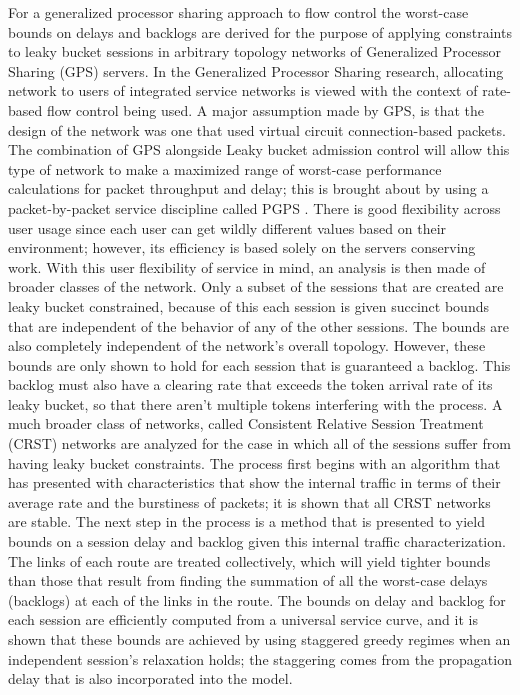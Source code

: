 \documentclass{sigcomm-alternate}
\begin{document}
For a generalized processor sharing approach to flow control the worst-case bounds on delays and backlogs are derived for the purpose of applying constraints to leaky bucket sessions in arbitrary topology networks of Generalized Processor Sharing (GPS) \cite{Parek} servers. In the Generalized Processor Sharing research, allocating network to users of integrated service networks is viewed with the context of rate-based flow control being used. A major assumption made by GPS, is that the design of the network was one that used virtual circuit connection-based packets. The combination of GPS alongside Leaky bucket admission control will allow this type of network to make a maximized range of worst-case performance calculations for packet throughput and delay; this is brought about by using a packet-by-packet service discipline called PGPS \cite{demers}. There is good flexibility across user usage since each user can get wildly different values based on their environment; however, its efficiency is based solely on the servers conserving work. 
With this user flexibility of service in mind, an analysis is then made of broader classes of the network. Only a subset of the sessions that are created are leaky bucket constrained, because of this each session is given succinct bounds that are independent of the behavior of any of the other sessions. The bounds are also completely independent of the network’s overall topology. However, these bounds are only shown to hold for each session that is guaranteed a backlog. This backlog must also have a clearing rate that exceeds the token arrival rate of its leaky bucket, so that there aren’t multiple tokens interfering with the process.
A much broader class of networks, called Consistent Relative Session Treatment (CRST) networks are analyzed for the case in which all of the sessions suffer from having leaky bucket constraints. The process first begins with an algorithm that has presented with characteristics that show the internal traffic in terms of their average rate and the burstiness of packets; it is shown that all CRST networks are stable. The next step in the process is a method that is presented to yield bounds on a session delay and backlog given this internal traffic characterization. The links of each route are treated collectively, which will yield tighter bounds than those that result from finding the summation of all the worst-case delays (backlogs) at each of the links in the route. The bounds on delay and backlog for each session are efficiently computed from a universal service curve, and it is shown that these bounds are achieved by using staggered greedy regimes when an independent session’s relaxation holds;  the staggering comes from the propagation delay that is also incorporated into the model.
\end{document}

